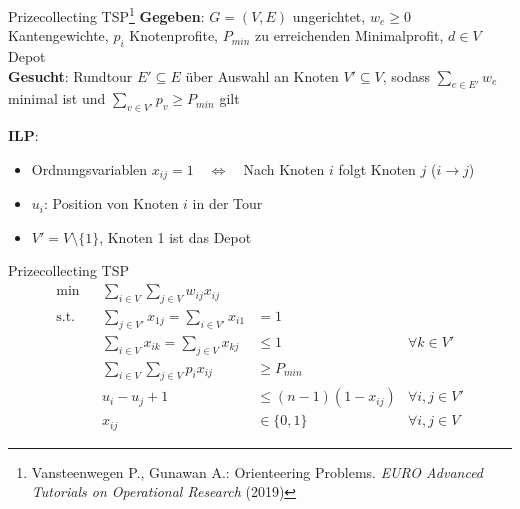 \documentclass[ngerman,aspectratio=169,10pt]{beamer}
\begin{document}
\begin{frame}{Prizecollecting TSP\footnote{Vansteenwegen P., Gunawan A.: Orienteering Problems. \emph{EURO Advanced Tutorials on Operational Research} (2019)}}
	\textbf{Gegeben}: $G=(V,E)$ ungerichtet, $w_e\geq0$ Kantengewichte, $p_i$ Knotenprofite, $P_{min}$ zu erreichenden Minimalprofit, $d\in V$ Depot\\
	\textbf{Gesucht}: Rundtour $E'\subseteq E$ über Auswahl an Knoten $V'\subseteq V$, sodass $\sum_{e\in E'}w_e$ minimal ist und $\sum_{v\in V'}p_v\geq P_{min}$ gilt
	
	\textbf{ILP}:
	\begin{itemize}
		\item Ordnungsvariablen $x_{ij}=1\quad\Leftrightarrow\quad$Nach Knoten $i$ folgt Knoten $j$ ($i\rightarrow j$)
		\item $u_i$: Position von Knoten $i$ in der Tour
		\item $V'=V\setminus\{1\}$, Knoten 1 ist das Depot
	\end{itemize}
\end{frame}

\begin{frame}{Prizecollecting TSP}
	\begin{align*}
	\min && \sum_{i\in V}\sum_{j\in V}w_{ij}x_{ij}&&\\
	\text{s.t.} && \sum_{j\in V'}x_{1j}=\sum_{i\in V'}x_{i1}&=1&\\
	&& \sum_{i\in V}x_{ik} = \sum_{j\in V}x_{kj}&\leq1 &\forall k\in V'\\
	&& \sum_{i\in V}\sum_{j\in V}p_ix_{ij} &\geq P_{min} &\\
	&& u_i-u_j+1&\leq(n-1)(1-x_{ij})&\forall i,j\in V'\\
	&& x_{ij} &\in\{0,1\} &\forall i,j\in V
	\end{align*}
\end{frame}
\end{document}
